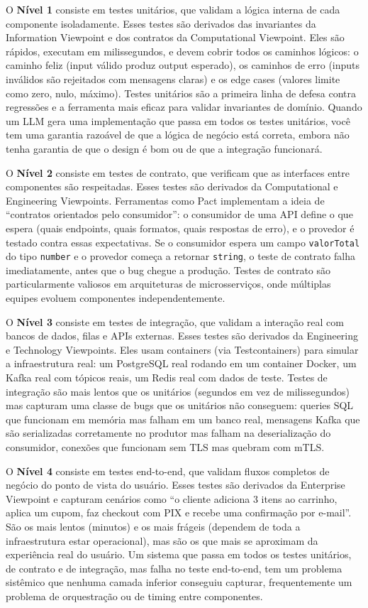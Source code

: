 O \textbf{Nível 1} consiste em testes unitários, que validam a lógica interna de
cada componente isoladamente. Esses testes são derivados das invariantes da
Information Viewpoint e dos contratos da Computational Viewpoint. Eles são rápidos,
executam em milissegundos, e devem cobrir todos os caminhos lógicos: o
caminho feliz (input válido produz output esperado), os caminhos de erro (inputs
inválidos são rejeitados com mensagens claras) e os edge cases (valores limite
como zero, nulo, máximo). Testes unitários são a primeira linha de defesa contra
regressões e a ferramenta mais eficaz para validar invariantes de domínio. Quando
um LLM gera uma implementação que passa em todos os testes unitários, você tem
uma garantia razoável de que a lógica de negócio está correta, embora não tenha
garantia de que o design é bom ou de que a integração funcionará.

O \textbf{Nível 2} consiste em testes de contrato, que verificam que as interfaces
entre componentes são respeitadas. Esses testes são derivados da Computational e
Engineering Viewpoints. Ferramentas como Pact implementam a ideia de ``contratos
orientados pelo consumidor'': o consumidor de uma API define o que espera (quais
endpoints, quais formatos, quais respostas de erro), e o provedor é testado contra
essas expectativas. Se o consumidor espera um campo \texttt{valorTotal} do tipo
\texttt{number} e o provedor começa a retornar \texttt{string}, o teste de contrato
falha imediatamente, antes que o bug chegue a produção. Testes de contrato são
particularmente valiosos em arquiteturas de microsserviços, onde múltiplas equipes
evoluem componentes independentemente.

O \textbf{Nível 3} consiste em testes de integração, que validam a interação real
com bancos de dados, filas e APIs externas. Esses testes são derivados da
Engineering e Technology Viewpoints. Eles usam containers (via Testcontainers) para
simular a infraestrutura real: um PostgreSQL real rodando em um container Docker,
um Kafka real com tópicos reais, um Redis real com dados de teste. Testes de
integração são mais lentos que os unitários (segundos em vez de milissegundos)
mas capturam uma classe de bugs que os unitários não conseguem: queries SQL que
funcionam em memória mas falham em um banco real, mensagens Kafka que são
serializadas corretamente no produtor mas falham na deserialização do consumidor,
conexões que funcionam sem TLS mas quebram com mTLS.

O \textbf{Nível 4} consiste em testes end-to-end, que validam fluxos completos de
negócio do ponto de vista do usuário. Esses testes são derivados da Enterprise
Viewpoint e capturam cenários como ``o cliente adiciona 3 itens ao carrinho, aplica
um cupom, faz checkout com PIX e recebe uma confirmação por e-mail''. São os mais
lentos (minutos) e os mais frágeis (dependem de toda a infraestrutura estar
operacional), mas são os que mais se aproximam da experiência real do usuário. Um
sistema que passa em todos os testes unitários, de contrato e de integração, mas
falha no teste end-to-end, tem um problema sistêmico que nenhuma camada inferior
conseguiu capturar, frequentemente um problema de orquestração ou de timing
entre componentes.


